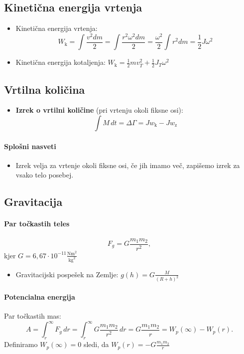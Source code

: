 \newpage
\subsection{Kinetična energija vrtenja}
\begin{itemize}
    \item Kinetična energija vrtenja:
    \[W_\text{k} = \int \frac{v^2dm}{2} = \int \frac{r^2 \omega^2 dm}{2} = \frac{\omega^2}{2} \int r^2 dm = \frac{1}{2} J \omega^2\]
    \item Kinetična energija kotaljenja: \(W_\text{k} = \frac{1}{2}mv^2_T + \frac{1}{2}J_T \omega^2\)
\end{itemize}

\subsection{Vrtilna količina}
\begin{itemize}
    \item \textbf{Izrek o vrtilni količine} (pri vrtenju okoli fiksne osi): 
    \[\int M \, dt = \Delta \Gamma = Jw_\text{k} - Jw_\text{z}\]
\end{itemize}

\paragraph{Splošni nasveti}
\begin{itemize}
    \item Izrek velja za vrtenje okoli fiksne osi, če jih imamo več, zapišemo izrek za vsako telo posebej.
\end{itemize}

\subsection{Gravitacija}
\paragraph{Par točkastih teles}
\[F_g = G \frac{m_1m_2}{r^2},\]
kjer \(G = 6,67 \cdot 10^{-11} \frac{\text{Nm}^2}{\text{kg}^2}\)
\begin{itemize}
    \item Gravitacijski pospešek na Zemlje: \(g(h) = G \frac{M}{(R+h)^2}\)
\end{itemize}
\paragraph{Potencialna energija} Par točkastih mas:
\[A = \int_{r}^{\infty} F_g \, dr =  \int_{r}^{\infty}G \frac{m_1m_2}{r^2} \, dr = G\frac{m_1m_2}{r} = W_p(\infty) - W_p(r).\]
Definiramo \(W_p(\infty) = 0\) sledi, da \(W_p(r) = - G\frac{m_1m_2}{r}\)

